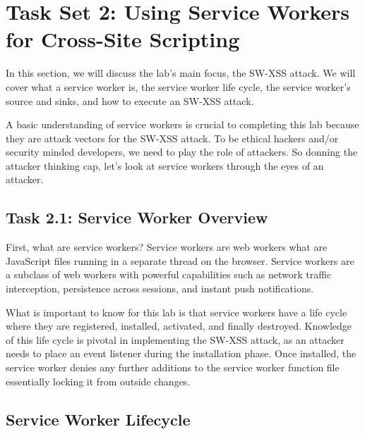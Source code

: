 \documentclass[letterpaper,12pt]{report}
\begin{document}

\section*{Task Set 2: Using Service Workers for Cross-Site Scripting}\label{sec:Task 3: Using Service Workers for Cross-Site Scripting}

In this section, we will discuss the lab's main focus, the SW-XSS attack. We will cover what a service worker is, the service worker life cycle, the service worker's source and sinks, and how to execute an SW-XSS attack.

A basic understanding of service workers is crucial to completing this lab because they are attack vectors for the SW-XSS attack. To be ethical hackers and/or security minded developers, we need to play the role of attackers. So donning the attacker thinking cap, let’s look at service workers through the eyes of an attacker.

\subsection*{Task 2.1: Service Worker Overview}

First, what are service workers? Service workers are web workers what are JavaScript files running in a separate thread on the browser. Service workers are a subclass of web workers with powerful capabilities such as network traffic interception, persistence across sessions, and instant push notifications. 

What is important to know for this lab is that service workers have a life cycle where they are registered, installed, activated, and finally destroyed. Knowledge of this life cycle is pivotal in implementing the SW-XSS attack, as an attacker needs to place an event listener during the installation phase. Once installed, the service worker denies any further additions to the service worker function file essentially locking it from outside changes.

\subsection*{Service Worker Lifecycle}
\end{document}
